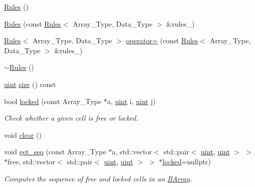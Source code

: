 \begin{DoxyCompactItemize}
\item 
\hyperlink{classbarry_1_1_rules_ac9468cdfab55a3be6675ad1fddae2bc0}{Rules} ()
\item 
\hyperlink{classbarry_1_1_rules_a57f5ab44febba391b2a06d163d25b237}{Rules} (const \hyperlink{classbarry_1_1_rules}{Rules}$<$ Array\+\_\+\+Type, Data\+\_\+\+Type $>$ \&rules\+\_\+)
\item 
\hyperlink{classbarry_1_1_rules}{Rules}$<$ Array\+\_\+\+Type, Data\+\_\+\+Type $>$ \hyperlink{classbarry_1_1_rules_ab87544febb8301772164570708bd708e}{operator=} (const \hyperlink{classbarry_1_1_rules}{Rules}$<$ Array\+\_\+\+Type, Data\+\_\+\+Type $>$ \&rules\+\_\+)
\item 
\hyperlink{classbarry_1_1_rules_a287ba2cf76f83ad982c05383b5726946}{$\sim$\+Rules} ()
\item 
\hyperlink{namespacebarry_a11dfc53ddb4672278319aa04f1e09a6c}{uint} \hyperlink{classbarry_1_1_rules_a590fd2603dd686e91e33330529ab8e77}{size} () const
\item 
bool \hyperlink{classbarry_1_1_rules_a4e08a6b3d8b536cb1717c62192a91537}{locked} (const Array\+\_\+\+Type $\ast$a, \hyperlink{namespacebarry_a11dfc53ddb4672278319aa04f1e09a6c}{uint} i, \hyperlink{namespacebarry_a11dfc53ddb4672278319aa04f1e09a6c}{uint} j)
\begin{DoxyCompactList}\small\item\em Check whether a given cell is free or locked. \end{DoxyCompactList}\item 
void \hyperlink{classbarry_1_1_rules_a135a15d3ff70d4350d76a15f8e85f7df}{clear} ()
\item 
void \hyperlink{classbarry_1_1_rules_a7b8f29955ec52f49808d7ea1cd4eaf5e}{get\+\_\+seq} (const Array\+\_\+\+Type $\ast$a, std\+::vector$<$ std\+::pair$<$ \hyperlink{namespacebarry_a11dfc53ddb4672278319aa04f1e09a6c}{uint}, \hyperlink{namespacebarry_a11dfc53ddb4672278319aa04f1e09a6c}{uint} $>$ $>$ $\ast$free, std\+::vector$<$ std\+::pair$<$ \hyperlink{namespacebarry_a11dfc53ddb4672278319aa04f1e09a6c}{uint}, \hyperlink{namespacebarry_a11dfc53ddb4672278319aa04f1e09a6c}{uint} $>$ $>$ $\ast$\hyperlink{classbarry_1_1_rules_a4e08a6b3d8b536cb1717c62192a91537}{locked}=nullptr)
\begin{DoxyCompactList}\small\item\em Computes the sequence of free and locked cells in an \hyperlink{classbarry_1_1_b_array}{B\+Array}. \end{DoxyCompactList}\end{DoxyCompactItemize}

